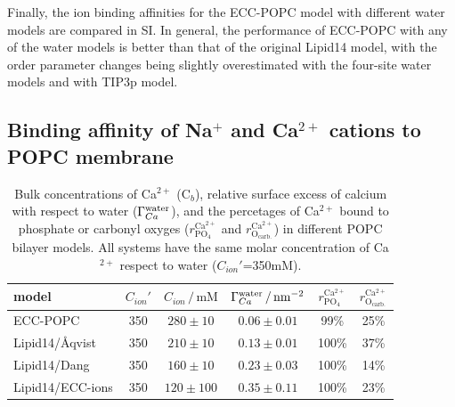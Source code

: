 \documentclass[aip,jcp,twocolumn]{revtex4}
\begin{document}
Finally, the ion binding affinities for the ECC-POPC model with different water models are compared in SI. In general, the performance of ECC-POPC with any of the water models is better than that of the original Lipid14 model, with the order parameter changes being slightly overestimated with the four-site water models and with TIP3p model.


\subsection{Binding affinity of Na$^+$ and Ca$^{2+}$ cations to POPC membrane}
\label{sec:affinity}


\begin{table}[tb!]
  \caption{Bulk concentrations of Ca$^{2+}$ (C$_b$), relative surface excess of calcium with respect to water ($\Gamma_{Ca}^{\rm water}$),
    and the percetages of Ca$^{2+}$ bound to phosphate or carbonyl oxyges ($r^\mathrm{Ca^{2+}} _\mathrm{PO_4} $ and $r^\mathrm{Ca^{2+}} _\mathrm{O_{carb.}}$)
    in different POPC bilayer models. All systems have the same molar concentration of Ca$^{2+}$ respect to water ($C_{ion}'$=350mM).
  \label{tab:binding}}
  \begin{tabular}{l|c c | c | c c}
    model                  & $C_{ion}'$ & $C_{ion}\,/\,\mathrm{mM}$ & $\Gamma_{Ca}^{\rm water} \,/\, \mathrm{nm}^{-2}$  & $r^\mathrm{Ca^{2+}} _\mathrm{PO_4} $ & $r^\mathrm{Ca^{2+}} _\mathrm{O_{carb.}} $ \\
    \hline
    ECC-POPC             &  350  &  $280\pm 10 $  &  $0.06 \pm 0.01 $                           &  99\%  &    25\%    \\
    Lipid14/\AA{}qvist     &  350  &  $210\pm 10 $  &  $0.13 \pm 0.01 $                          & 100\%  &    37\%     \\
    Lipid14/Dang           &  350  &  $160\pm 10 $  &  $0.23 \pm 0.03 $                            & 100\%  &    14\%    \\
    Lipid14/ECC-ions       &  350  &  $120\pm 100$  &  $0.35 \pm 0.11 $                         & 100\%  &    23\%    \\
  \end{tabular}
\end{table}
\end{document}
